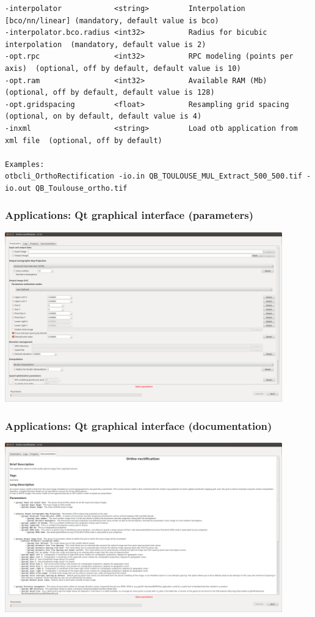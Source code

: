\documentclass[8pt]{beamer}
\begin{document}
\begin{frame}[fragile]
\begin{scriptsize}
\begin{verbatim}
-interpolator            <string>         Interpolation [bco/nn/linear] (mandatory, default value is bco)
-interpolator.bco.radius <int32>          Radius for bicubic interpolation  (mandatory, default value is 2)
-opt.rpc                 <int32>          RPC modeling (points per axis)  (optional, off by default, default value is 10)
-opt.ram                 <int32>          Available RAM (Mb)  (optional, off by default, default value is 128)
-opt.gridspacing         <float>          Resampling grid spacing  (optional, on by default, default value is 4)
-inxml                   <string>         Load otb application from xml file  (optional, off by default)

Examples: 
otbcli_OrthoRectification -io.in QB_TOULOUSE_MUL_Extract_500_500.tif -io.out QB_Toulouse_ortho.tif
\end{verbatim}
\end{scriptsize}
\end{frame}

\begin{frame}[fragile]
\frametitle{Applications: Qt graphical interface (parameters)}
\begin{center}
\includegraphics[width=0.9\textwidth]{images/app_parameters.png}
\end{center}
\end{frame}


\begin{frame}[fragile]
\frametitle{Applications: Qt graphical interface (documentation)}
\begin{center}
\includegraphics[width=0.9\textwidth]{images/app_doc.png}
\end{center}
\end{frame}
\end{document}
